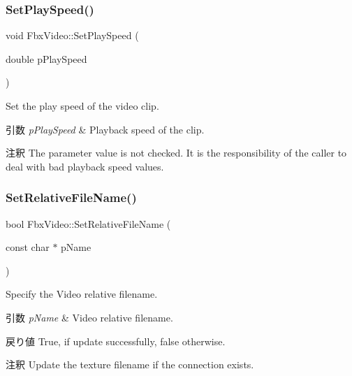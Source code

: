 \mbox{\label{class_fbx_video_a9f7fd819e6d3eeea943183264c55d357}} 
\subsubsection{\texorpdfstring{Set\+Play\+Speed()}{SetPlaySpeed()}}
{\footnotesize\ttfamily void Fbx\+Video\+::\+Set\+Play\+Speed (\begin{DoxyParamCaption}\item[{double}]{p\+Play\+Speed }\end{DoxyParamCaption})}

Set the play speed of the video clip. 
\begin{DoxyParams}{引数}
{\em p\+Play\+Speed} & Playback speed of the clip. \\
\hline
\end{DoxyParams}
\begin{DoxyRemark}{注釈}
The parameter value is not checked. It is the responsibility of the caller to deal with bad playback speed values. 
\end{DoxyRemark}
\mbox{\label{class_fbx_video_a3217bac3585954766fa2c56a10de48f3}} 
\subsubsection{\texorpdfstring{Set\+Relative\+File\+Name()}{SetRelativeFileName()}}
{\footnotesize\ttfamily bool Fbx\+Video\+::\+Set\+Relative\+File\+Name (\begin{DoxyParamCaption}\item[{const char $\ast$}]{p\+Name }\end{DoxyParamCaption})}

Specify the Video relative filename. 
\begin{DoxyParams}{引数}
{\em p\+Name} & Video relative filename. \\
\hline
\end{DoxyParams}
\begin{DoxyReturn}{戻り値}
{\ttfamily True}, if update successfully, {\ttfamily false} otherwise. 
\end{DoxyReturn}
\begin{DoxyRemark}{注釈}
Update the texture filename if the connection exists. 
\end{DoxyRemark}
\mbox{\label{class_fbx_video_a85a31f27e4cca068fd285385998bcad5}} 
